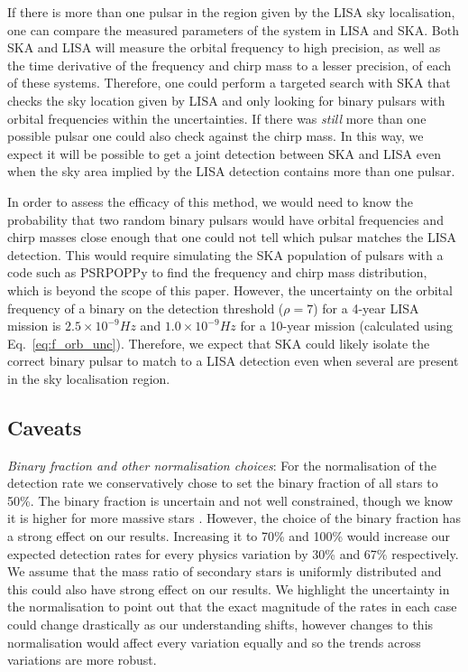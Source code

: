 If there is more than one pulsar in the region given by the LISA sky localisation, one can compare the measured parameters of the system in LISA and SKA. Both SKA and LISA will measure the orbital frequency to high precision, as well as the time derivative of the frequency and chirp mass to a lesser precision, of each of these systems. Therefore, one could perform a targeted search with SKA that checks the sky location given by LISA and only looking for binary pulsars with orbital frequencies within the uncertainties. If there was \textit{still} more than one possible pulsar one could also check against the chirp mass. In this way, we expect it will be possible to get a joint detection between SKA and LISA even when the sky area implied by the LISA detection contains more than one pulsar.

In order to assess the efficacy of this method, we would need to know the probability that two random binary pulsars would have orbital frequencies and chirp masses close enough that one could not tell which pulsar matches the LISA detection. This would require simulating the SKA population of pulsars with a code such as PSRPOPPy to find the frequency and chirp mass distribution, which is beyond the scope of this paper. However, the uncertainty on the orbital frequency of a binary on the detection threshold ($\rho = 7$) for a 4-year LISA mission is $2.5 \times 10^{-9} \unit{Hz}$ and $1.0 \times 10^{-9} \unit{Hz}$ for a 10-year mission (calculated using Eq.~\ref{eq:f_orb_unc}). Therefore, we expect that SKA could likely isolate the correct binary pulsar to match to a LISA detection even when several are present in the sky localisation region.

\subsection{Caveats}\label{sec:caveats}
\textit{Binary fraction and other normalisation choices}: For the normalisation of the detection rate we conservatively chose to set the binary fraction of all stars to 50\%. The binary fraction is uncertain and not well constrained, though we know it is higher for more massive stars \citep[e.g.][]{Sana+2012}. However, the choice of the binary fraction has a strong effect on our results. Increasing it to 70\% and 100\% would increase our expected detection rates for every physics variation by 30\% and 67\% respectively. We assume that the mass ratio of secondary stars is uniformly distributed and this could also have strong effect on our results. We highlight the uncertainty in the normalisation to point out that the exact magnitude of the rates in each case could change drastically as our understanding shifts, however changes to this normalisation would affect every variation equally and so the trends across variations are more robust.

